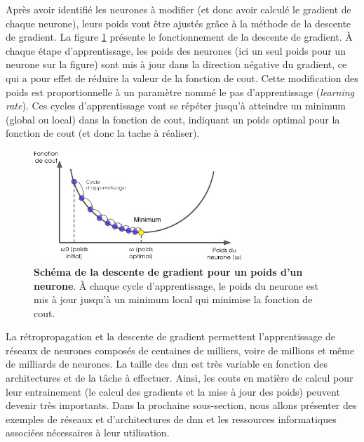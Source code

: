 Après avoir identifié les neurones à modifier (et donc avoir calculé le gradient de chaque neurone), leurs poids vont être ajustés grâce à la méthode de la descente de gradient. La figure \ref{fig:grad_descent} présente le fonctionnement de la descente de gradient. À chaque étape d'apprentissage, les poids des neurones (ici un seul poids pour un neurone sur la figure) sont mis à jour dans la direction négative du gradient, ce qui a pour effet de réduire la valeur de la fonction de cout. Cette modification des poids est proportionnelle à un paramètre nommé le pas d'apprentissage (\textit{learning rate}). Ces cycles d'apprentissage vont se répéter jusqu'à atteindre un minimum (global ou local) dans la fonction de cout, indiquant un poids optimal pour la fonction de cout (et donc la tache à réaliser).
\begin{figure}[!ht]
 \centering
 \includegraphics[width=0.7\textwidth]{figures/gradient_descent.png}
 \caption[Schéma de la descente de gradient pour un poids d'un neurone]{\textbf{Schéma de la descente de gradient pour un poids d'un neurone}. À chaque cycle d'apprentissage, le poids du neurone est mis à jour jusqu'à un minimum local qui minimise la fonction de cout.}
 \label{fig:grad_descent}
\end{figure}


La rétropropagation et la descente de gradient permettent l'apprentissage de réseaux de neurones composés de centaines de milliers, voire de millions et même de milliards de neurones. La taille des \gls{dnn} est très variable en fonction des architectures et de la tâche à effectuer. Ainsi, les couts en matière de calcul pour leur entrainement (le calcul des gradients et la mise à jour des poids) peuvent devenir très importants. Dans la prochaine sous-section, nous allons présenter des exemples de réseaux et d'architectures de \gls{dnn} et les ressources informatiques associées nécessaires à leur utilisation.

